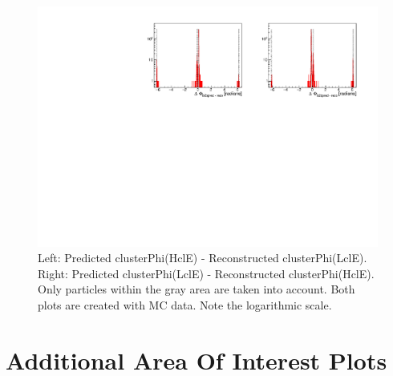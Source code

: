 \documentclass[a4paper,11pt,twosided,final,german,openbib,pdftex,listof=totoc,bibliography=totoc]{scrbook}
\begin{document}
\begin{appendix}
\begin{figure}[!htbp]
	\centering
	\includegraphics[width=\textwidth]{Plots/sb2b_MC_0.pdf}
	\caption[b2bClusterPhi - clusterPhi For MC (Whole Range)]{Left: Predicted clusterPhi(HclE) - Reconstructed clusterPhi(LclE). Right: Predicted clusterPhi(LclE) - Reconstructed clusterPhi(HclE). Only particles within the gray area are taken into account. Both plots are created with MC data. Note the logarithmic scale.}
	\label{fig:b2bMC_Whole}
\end{figure}
\newpage

\section{Additional Area Of Interest Plots}






\end{appendix}
\end{document}

